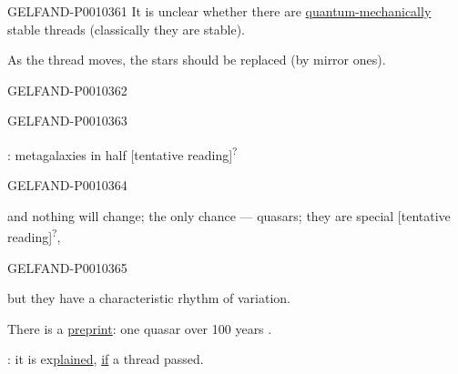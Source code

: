 \begin{GelfandAdjacentEvidence}{GELFAND-P001036}{1}
It is unclear whether there are \underline{quantum-mechanically} stable threads (classically they are stable).

As the thread moves, the stars should be replaced (by mirror ones).
\end{GelfandAdjacentEvidence}
\begin{GelfandAdjacentEvidence}{GELFAND-P001036}{2}

\end{GelfandAdjacentEvidence}
\begin{GelfandAdjacentEvidence}{GELFAND-P001036}{3}


: metagalaxies in half [tentative reading]\textsuperscript{?}
\end{GelfandAdjacentEvidence}
\begin{GelfandAdjacentEvidence}{GELFAND-P001036}{4}

and nothing will change;
the only chance --- quasars; they are
special [tentative reading]\textsuperscript{?},
\end{GelfandAdjacentEvidence}
\begin{GelfandAdjacentEvidence}{GELFAND-P001036}{5}

but they have a characteristic rhythm of variation.

There is a \underline{preprint}: one quasar over 100 years
.
\end{GelfandAdjacentEvidence}


: it is ex\underline{plained}, \underline{if} a thread passed.


